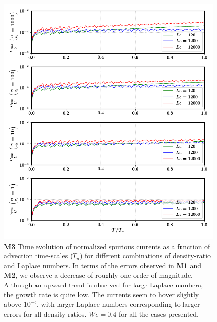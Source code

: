 \begin{figure}[h!]
    \centering
    \includegraphics[]{plots/droplet_advect/evo_sagar.png}
	\caption{\textbf{M3} Time evolution of normalized spurious currents as a function of advection time-scales ($T_u$) for different combinations of density-ratio and Laplace numbers. In terms of the errors observed in \textbf{M1} and \textbf{M2}, we observe a decrease of roughly one order of magnitude. Although an upward trend is observed for large Laplace numbers, the growth rate is quite low. The currents seem to hover slightly above $10^{-4}$, with larger Laplace numbers corresponding to larger errors for all density-ratios. $We = 0.4$ for all the cases presented.}   
    \label{evo_sagar}
\end{figure}

